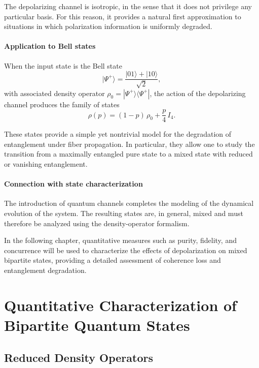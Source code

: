 \documentclass[a4paper]{article}
\begin{document}
The depolarizing channel is isotropic, in the sense that it does not privilege any particular basis. For this reason, it provides a natural first approximation to situations in which polarization information is uniformly degraded.

\paragraph{Application to Bell states}

When the input state is the Bell state
\[
|\Psi^+\rangle = \frac{|01\rangle + |10\rangle}{\sqrt{2}},
\]
with associated density operator \(\rho_0 = |\Psi^+\rangle\langle\Psi^+|\), the action of the depolarizing channel produces the family of states
\[
\rho(p)
=
(1 - p)\,\rho_0
+
\frac{p}{4}\, I_4.
\]

These states provide a simple yet nontrivial model for the degradation of entanglement under fiber propagation. In particular, they allow one to study the transition from a maximally entangled pure state to a mixed state with reduced or vanishing entanglement.

\paragraph{Connection with state characterization}

The introduction of quantum channels completes the modeling of the dynamical evolution of the system. The resulting states are, in general, mixed and must therefore be analyzed using the density-operator formalism.

In the following chapter, quantitative measures such as purity, fidelity, and concurrence will be used to characterize the effects of depolarization on mixed bipartite states, providing a detailed assessment of coherence loss and entanglement degradation.



\section{Quantitative Characterization of Bipartite Quantum States}

\subsection{Reduced Density Operators}
\end{document}
